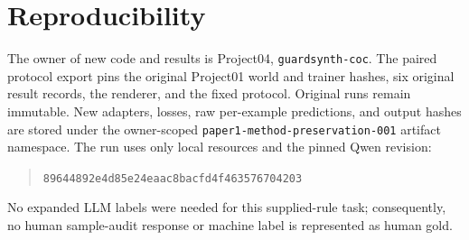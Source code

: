 \documentclass[11pt]{article}
\begin{document}
\section{Reproducibility}
The owner of new code and results is Project04, \texttt{guardsynth-coc}.
The paired protocol export pins the original Project01 world and trainer hashes,
six original result records, the renderer, and the fixed protocol. Original runs
remain immutable. New adapters, losses, raw per-example predictions, and output
hashes are stored under the owner-scoped \texttt{paper1-method-preservation-001}
artifact namespace. The run uses only local resources and the pinned Qwen
revision:
\begin{quote}\small\texttt{89644892e4d85e24eaac8bacfd4f463576704203}\end{quote}
No expanded LLM labels were needed for this supplied-rule task; consequently,
no human sample-audit response or machine label is represented as human gold.
\end{document}
